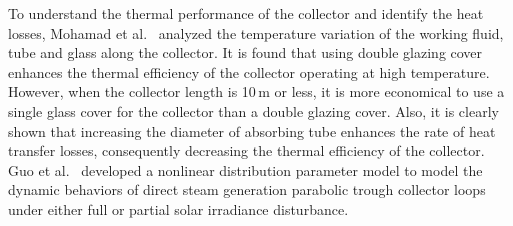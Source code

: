 To understand the thermal performance of the collector and identify the heat losses, Mohamad et al.~\cite{Mohamad2014} analyzed the temperature variation of the working fluid, tube and glass along the collector. It is found that using double glazing cover enhances the thermal efficiency of the collector operating at high temperature. However, when the collector length is 10$\,\mathrm{m}$ or less, it is more economical to use a single glass cover for the collector than a double glazing cover.
Also, it is clearly shown that increasing the diameter of absorbing tube enhances the rate of heat transfer losses, consequently decreasing the thermal efficiency of the collector.
Guo et al.~\cite{SuGuo2016} developed a nonlinear distribution parameter model to model the dynamic behaviors of direct steam generation parabolic trough collector loops under either full or partial solar irradiance disturbance.

